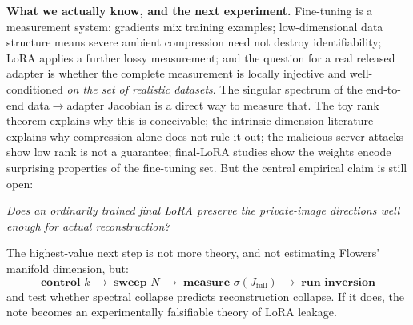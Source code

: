\begin{revbox}
\textbf{What we actually know, and the next experiment.}
Fine-tuning is a measurement system: gradients mix training examples; low-dimensional data
structure means severe ambient compression need not destroy identifiability; LoRA applies
a further lossy measurement; and the question for a real released adapter is whether the
complete measurement is locally injective and well-conditioned \emph{on the set of
realistic datasets}. The singular spectrum of the end-to-end data$\to$adapter Jacobian is
a direct way to measure that. The toy rank theorem explains why this is conceivable; the
intrinsic-dimension literature explains why compression alone does not rule it out; the
malicious-server attacks show low rank is not a guarantee; final-LoRA studies show the
weights encode surprising properties of the fine-tuning set. But the central empirical
claim is still open:
\begin{center}\itshape
Does an ordinarily trained final LoRA preserve the private-image directions well enough
for actual reconstruction?
\end{center}
The highest-value next step is not more theory, and not estimating Flowers' manifold
dimension, but:
\[
\boxed{\textbf{control } k \;\to\; \textbf{sweep } N \;\to\;
\textbf{measure } \sigma(J_{\mathrm{full}}) \;\to\; \textbf{run inversion}}
\]
and test whether spectral collapse predicts reconstruction collapse. If it does, the note
becomes an experimentally falsifiable theory of LoRA leakage.
\end{revbox}
